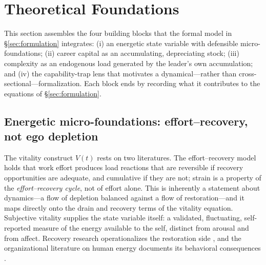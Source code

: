 \section{Theoretical Foundations}
\label{sec:foundations}

This section assembles the four building blocks that the formal model in
\S\ref{sec:formulation} integrates: (i) an energetic state variable with
defensible micro-foundations; (ii) career capital as an accumulating,
depreciating stock; (iii) complexity as an endogenous load generated by the
leader's own accumulation; and (iv) the capability-trap lens that motivates
a dynamical---rather than cross-sectional---formalization. Each block ends
by recording what it contributes to the equations of
\S\ref{sec:formulation}.

\subsection{Energetic micro-foundations: effort--recovery, not ego depletion}
\label{sec:foundations-energy}

The vitality construct $V(t)$ rests on two literatures. The
effort--recovery model \citep{meijman1998effort} holds that work effort
produces load reactions that are reversible if recovery opportunities are
adequate, and cumulative if they are not; strain is a property of the
\emph{effort--recovery cycle}, not of effort alone. This is inherently a
statement about dynamics---a flow of depletion balanced against a flow of
restoration---and it maps directly onto the drain and recovery terms of
the vitality equation. Subjective vitality
\citep{ryan1997subjective,ryan2000self,nix1999revitalization} supplies the
state variable itself: a validated, fluctuating, self-reported measure of
the energy available to the self, distinct from arousal and from affect.
Recovery research operationalizes the restoration side
\citep{sonnentag2007recovery,sonnentag2022recovery}, and the organizational
literature on human energy documents its behavioral consequences
\citep{quinn2012humanenergy,owens2016relational}.

